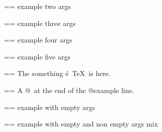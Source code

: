 \documentclass{book}
\makeatletter
\newenvironment{Texinfopreformatted}{%
  \par\GNUTobeylines\obeyspaces\frenchspacing\parskip=\z@\parindent=\z@}{}
{\catcode`\^^M=13 \gdef\GNUTobeylines{\catcode`\^^M=13 \def^^M{\null\par}}}
\newenvironment{Texinfoindented}{\begin{list}{}{}\item\relax}{\end{list}}
\renewcommand{\_}{\Texinfounderscore\discretionary{}{}{}}
\makeatother
\begin{document}
\begin{titlepage}
\begin{Texinfoindented}
\begin{Texinfopreformatted}%
\ttfamily example two args
\end{Texinfopreformatted}
\end{Texinfoindented}

\begin{Texinfoindented}
\begin{Texinfopreformatted}%
\ttfamily example three args
\end{Texinfopreformatted}
\end{Texinfoindented}

\begin{Texinfoindented}
\begin{Texinfopreformatted}%
\ttfamily example four args
\end{Texinfopreformatted}
\end{Texinfoindented}

\begin{Texinfoindented}
\begin{Texinfopreformatted}%
\ttfamily example five args
\end{Texinfopreformatted}
\end{Texinfoindented}

\begin{Texinfoindented}
\begin{Texinfopreformatted}%
\ttfamily The something \'{e}\ \TeX{}\ is here.
\end{Texinfopreformatted}
\end{Texinfoindented}

\begin{Texinfoindented}
\begin{Texinfopreformatted}%
\ttfamily A @\ at the end of the @example line.
\end{Texinfopreformatted}
\end{Texinfoindented}

\begin{Texinfoindented}
\begin{Texinfopreformatted}%
\ttfamily example with empty args
\end{Texinfopreformatted}
\end{Texinfoindented}

\begin{Texinfoindented}
\begin{Texinfopreformatted}%
\ttfamily example with empty and non empty args mix
\end{Texinfopreformatted}
\end{Texinfoindented}


\end{titlepage}
\end{document}

